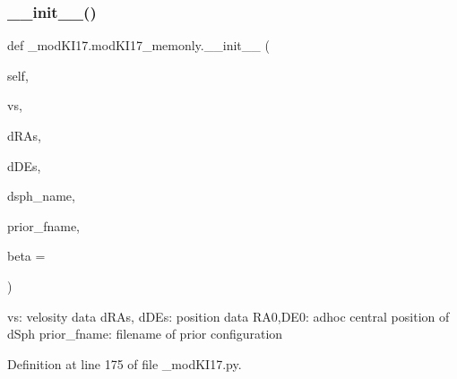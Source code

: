 \subsubsection{\texorpdfstring{\+\_\+\+\_\+init\+\_\+\+\_\+()}{\_\_init\_\_()}}
{\footnotesize\ttfamily def \+\_\+mod\+K\+I17.\+mod\+K\+I17\+\_\+memonly.\+\_\+\+\_\+init\+\_\+\+\_\+ (\begin{DoxyParamCaption}\item[{}]{self,  }\item[{}]{vs,  }\item[{}]{d\+R\+As,  }\item[{}]{d\+D\+Es,  }\item[{}]{dsph\+\_\+name,  }\item[{}]{prior\+\_\+fname,  }\item[{}]{beta = {} }\end{DoxyParamCaption})}

\begin{DoxyVerb}vs: velosity data
dRAs, dDEs: position data
RA0,DE0: adhoc central position of dSph 
prior_fname: filename of prior configuration
\end{DoxyVerb}
 

Definition at line 175 of file \+\_\+mod\+K\+I17.\+py.


